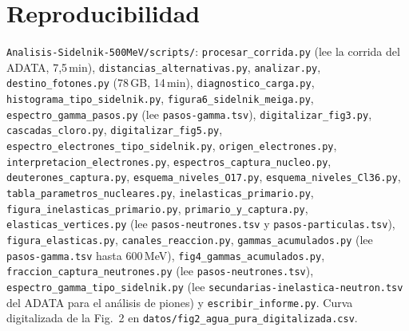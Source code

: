 \documentclass[11pt,a4paper]{article}
\begin{document}
\section{Reproducibilidad}
\texttt{Analisis-Sidelnik-500MeV/scripts/}: \texttt{procesar\_corrida.py} (lee la corrida del ADATA, 7,5\,min), \texttt{distancias\_alternativas.py},
\texttt{analizar.py}, \texttt{destino\_fotones.py} (78\,GB, 14\,min), \texttt{diagnostico\_carga.py}, \texttt{histograma\_tipo\_sidelnik.py}, \texttt{figura6\_sidelnik\_meiga.py}, \texttt{espectro\_gamma\_pasos.py} (lee \texttt{pasos-gamma.tsv}), \texttt{digitalizar\_fig3.py}, \texttt{cascadas\_cloro.py}, \texttt{digitalizar\_fig5.py}, \texttt{espectro\_electrones\_tipo\_sidelnik.py}, \texttt{origen\_electrones.py}, \texttt{interpretacion\_electrones.py}, \texttt{espectros\_captura\_nucleo.py}, \texttt{deuterones\_captura.py}, \texttt{esquema\_niveles\_O17.py}, \texttt{esquema\_niveles\_Cl36.py}, \texttt{tabla\_parametros\_nucleares.py}, \texttt{inelasticas\_primario.py}, \texttt{figura\_inelasticas\_primario.py}, \texttt{primario\_y\_captura.py}, \texttt{elasticas\_vertices.py} (lee \texttt{pasos-neutrones.tsv} y \texttt{pasos-particulas.tsv}), \texttt{figura\_elasticas.py}, \texttt{canales\_reaccion.py}, \texttt{gammas\_acumulados.py} (lee \texttt{pasos-gamma.tsv} hasta 600\,MeV), \texttt{fig4\_gammas\_acumulados.py}, \texttt{fraccion\_captura\_neutrones.py} (lee \texttt{pasos-neutrones.tsv}), \texttt{espectro\_gamma\_tipo\_sidelnik.py} (lee \texttt{secundarias-inelastica-neutron.tsv} del ADATA para el análisis de piones) y \texttt{escribir\_informe.py}. Curva digitalizada de la Fig.~2 en \texttt{datos/fig2\_agua\_pura\_digitalizada.csv}.
\end{document}
